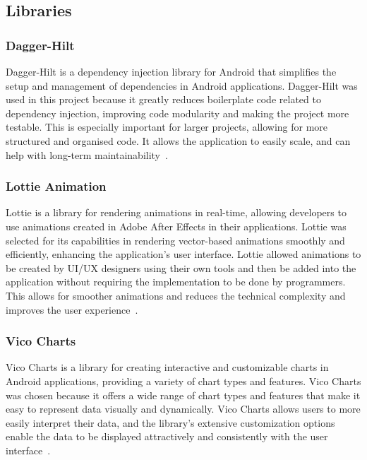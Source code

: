 \subsection{Libraries}

\subsubsection{Dagger-Hilt}
\label{sec:daggerhilt}
Dagger-Hilt is a dependency injection library for Android that simplifies the setup and management of dependencies in Android applications. Dagger-Hilt was used in this project because it greatly reduces boilerplate code related to dependency injection, improving code modularity and making the project more testable. This is especially important for larger projects, allowing for more structured and organised code. It allows the application to easily scale, and can help with long-term maintainability~\cite{bib:daggerhilt}.

\subsubsection{Lottie Animation}
\label{sec:lottie}
Lottie is a library for rendering animations in real-time, allowing developers to use animations created in Adobe After Effects in their applications. Lottie was selected for its capabilities in rendering vector-based animations smoothly and efficiently, enhancing the application’s user interface. Lottie allowed animations to be created by UI/UX designers using their own tools and then be added into the application without requiring the implementation to be done by programmers. This allows for smoother animations and reduces the technical complexity and improves the user experience~\cite{bib:lottie}.

\subsubsection{Vico Charts}
\label{sec:vicocharts}
Vico Charts is a library for creating interactive and customizable charts in Android applications, providing a variety of chart types and features. Vico Charts was chosen because it offers a wide range of chart types and features that make it easy to represent data visually and dynamically. Vico Charts allows users to more easily interpret their data, and the library’s extensive customization options enable the data to be displayed attractively and consistently with the user interface~\cite{bib:vicocharts}.

